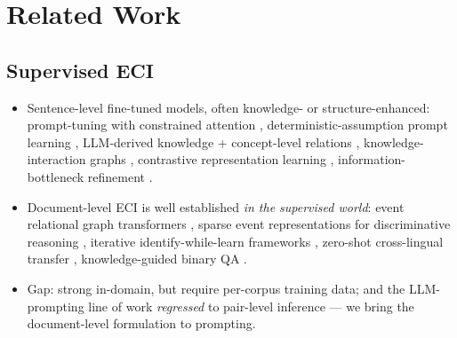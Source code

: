 \documentclass[11pt]{article}
\begin{document}
\section{Related Work}
\label{sec:related}

\subsection{Supervised ECI}
\begin{itemize}
  \item Sentence-level fine-tuned models, often knowledge- or structure-enhanced:
        prompt-tuning with constrained attention \citep{zhang2023cpatt},
        deterministic-assumption prompt learning \citep{xiang2023daprompt},
        LLM-derived knowledge + concept-level relations \citep{su2025lkcer},
        knowledge-interaction graphs \citep{hu2025kigp}, contrastive
        representation learning \citep{liao2026cleci}, information-bottleneck
        refinement \citep{zhao2026casr}.
  \item Document-level ECI is well established \emph{in the supervised world}:
        event relational graph transformers \citep{chen2022ergo}, sparse event
        representations for discriminative reasoning \citep{yuan2023sendir},
        iterative identify-while-learn frameworks \citep{liu2024ilif}, zero-shot
        cross-lingual transfer \citep{he2024gimc}, knowledge-guided binary QA
        \citep{wang2024knowqa}.
  \item Gap: strong in-domain, but require per-corpus training data; and the
        LLM-prompting line of work \emph{regressed} to pair-level inference ---
        we bring the document-level formulation to prompting.
\end{itemize}
\end{document}
